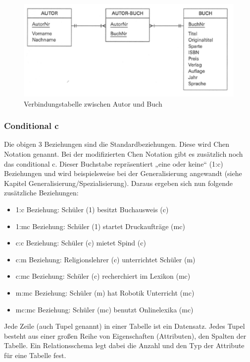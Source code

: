 \begin{figure}[h]
    \centering
    \includegraphics[width=.8\textwidth]{Content/images/modellierung/autorbuch.png}
    \caption{Verbindungstabelle zwischen Autor und Buch}
    \label{fig:modellierung:mn}
\end{figure}

\subsubsection{Conditional c}

Die obigen 3 Beziehungen sind die Standardbeziehungen. Diese wird Chen Notation genannt. Bei der modifizierten Chen Notation gibt es zusätzlich noch das conditional c. Dieser Buchstabe repräsentiert „eine oder keine“ (1:c) Beziehungen und wird beispielsweise bei der Generalisierung angewandt (siehe Kapitel Generalisierung/Spezialisierung). Daraus ergeben sich nun folgende zusätzliche Beziehungen:

\begin{itemize}
    \item 1:c Beziehung: Schüler (1) besitzt Buchausweis (c)
    \item 1:mc Beziehung: Schüler (1) startet Druckaufträge (mc)
    \item c:c Beziehung: Schüler (c) mietet Spind (c)
    \item c:m Beziehung: Religionslehrer (c) unterrichtet Schüler (m)
    \item c:mc Beziehung: Schüler (c) recherchiert im Lexikon (mc)
    \item m:mc Beziehung: Schüler (m) hat Robotik Unterricht (mc)
    \item mc:mc Beziehung: Schüler (mc) benutzt Onlinelexika (mc)
\end{itemize}

Jede Zeile (auch Tupel genannt) in einer Tabelle ist ein Datensatz. Jedes Tupel besteht aus einer großen Reihe von Eigenschaften (Attributen), den Spalten der Tabelle. Ein Relationsschema legt dabei die Anzahl und den Typ der Attribute für eine Tabelle fest.

